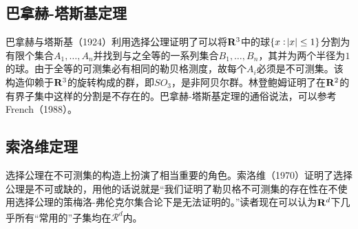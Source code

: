 \documentclass[main.tex]{subfiles}
\begin{document}
\subsection*{巴拿赫-塔斯基定理}
巴拿赫与塔斯基（1924）利用选择公理证明了可以将\(\mathbf{R}^3\)中的球\(\{x:\envert{x}\leq 1\}\)分割为有限个集合\(A_1,\dots, A_n\)并找到与之全等的一系列集合\(B_1, \dots, B_n\)，其并为两个半径为\(1\)的球。由于全等的可测集必有相同的勒贝格测度，故每个\(A_i\)必须是不可测集。该构造仰赖于\(\mathbf{R}^3\)的旋转构成的群，即\(SO_3\)，是非阿贝尔群。林登鲍姆证明了在\(\mathbf{R}^2\)的有界子集中这样的分割是不存在的。巴拿赫-塔斯基定理的通俗说法，可以参考French（1988）。
\subsection*{索洛维定理}
选择公理在不可测集的构造上扮演了相当重要的角色。索洛维（1970）证明了选择公理是不可或缺的，用他的话说就是``我们证明了勒贝格不可测集的存在性在不使用选择公理的策梅洛-弗伦克尔集合论下是无法证明的。''读者现在可以认为\(\mathbf{R}^d\)下几乎所有``常用的''子集均在\(\bar{\mathcal{R}^d}\)内。
\end{document}
